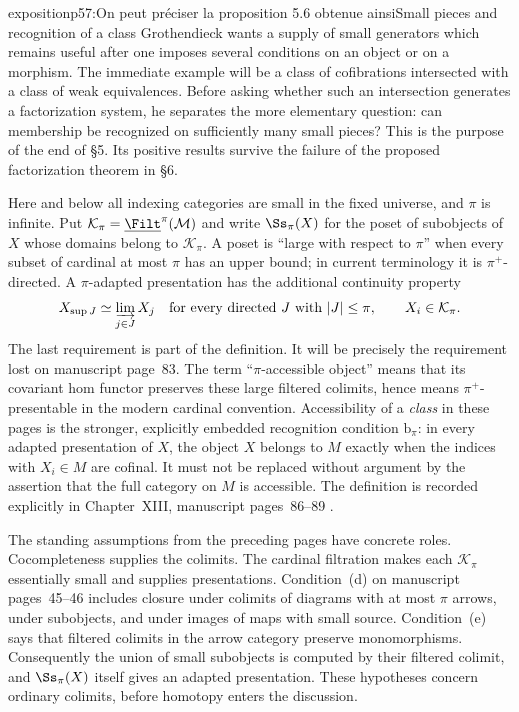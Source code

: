 \begin{dcomment}{exposition}{p57:On peut préciser la proposition 5.6 obtenue ainsi}{Small pieces and recognition of a class}
Grothendieck wants a supply of small generators which remains useful after one imposes several conditions on an object or on a morphism. The immediate example will be a class of cofibrations intersected with a class of weak equivalences. Before asking whether such an intersection generates a factorization system, he separates the more elementary question: can membership be recognized on sufficiently many small pieces? This is the purpose of the end of \S5. Its positive results survive the failure of the proposed factorization theorem in \S6.

Here and below all indexing categories are small in the fixed universe, and $\pi$ is infinite. Put $\mathcal K_\pi=\underline{\Filt}^{\pi}(\mathcal M)$ and write $\Ss_\pi(X)$ for the poset of subobjects of $X$ whose domains belong to $\mathcal K_\pi$. A poset is ``large with respect to $\pi$'' when every subset of cardinal at most $\pi$ has an upper bound; in current terminology it is $\pi^+$-directed. A $\pi$-adapted presentation has the additional continuity property
\[
 X_{\sup J}\simeq\varinjlim_{j\in J}X_j
 \quad\text{for every directed }J\text{ with }|J|\leq\pi,
 \qquad X_i\in\mathcal K_\pi.
\]
The last requirement is part of the definition. It will be precisely the requirement lost on manuscript page~83. The term ``$\pi$-accessible object'' means that its covariant hom functor preserves these large filtered colimits, hence means $\pi^+$-presentable in the modern cardinal convention. Accessibility of a \emph{class} in these pages is the stronger, explicitly embedded recognition condition $\mathrm b_\pi$: in every adapted presentation of $X$, the object $X$ belongs to $M$ exactly when the indices with $X_i\in M$ are cofinal. It must not be replaced without argument by the assertion that the full category on $M$ is accessible. The definition is recorded explicitly in Chapter~XIII, manuscript pages~86--89 \citep{Grothendieck1990XIII}.

The standing assumptions from the preceding pages have concrete roles. Cocompleteness supplies the colimits. The cardinal filtration makes each $\mathcal K_\pi$ essentially small and supplies presentations. Condition~(d) on manuscript pages~45--46 includes closure under colimits of diagrams with at most $\pi$ arrows, under subobjects, and under images of maps with small source. Condition~(e) says that filtered colimits in the arrow category preserve monomorphisms. Consequently the union of small subobjects is computed by their filtered colimit, and $\Ss_\pi(X)$ itself gives an adapted presentation. These hypotheses concern ordinary colimits, before homotopy enters the discussion.


\end{dcomment}
